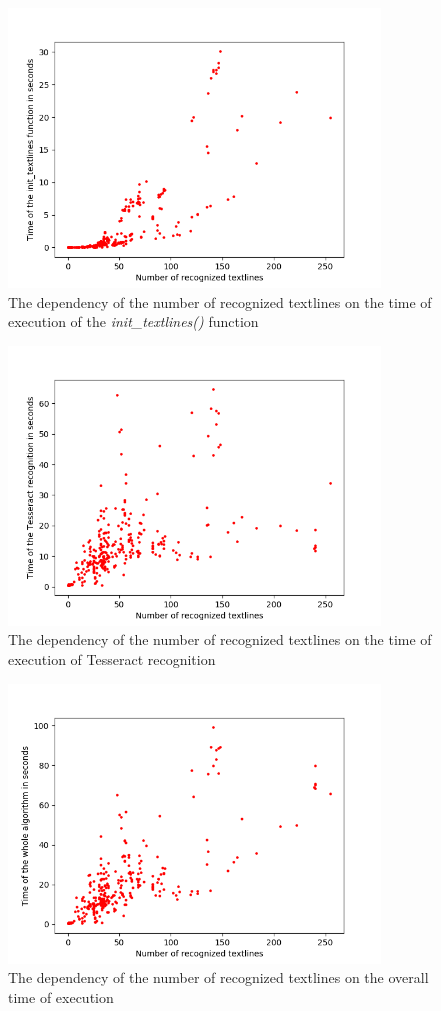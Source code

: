 \begin{figure}
\centering
\includegraphics[height=20em]{img/results/textlinesTimeInit.png}
\caption{The dependency of the number of recognized textlines on the time of execution of the \emph{init\_textlines()} function}
\label{fig:textlinesTimeInit}
\end{figure}

\begin{figure}
\centering
\includegraphics[height=20em]{img/results/textlinesTimeTesseract.png}
\caption{The dependency of the number of recognized textlines on the time of execution of Tesseract recognition}
\label{fig:textlinesTimeTess}
\end{figure}

\begin{figure}
\centering
\includegraphics[height=20em]{img/results/textlinesTimeAll.png}
\caption{The dependency of the number of recognized textlines on the overall time of execution}
\label{fig:textlinesTime}
\end{figure}

